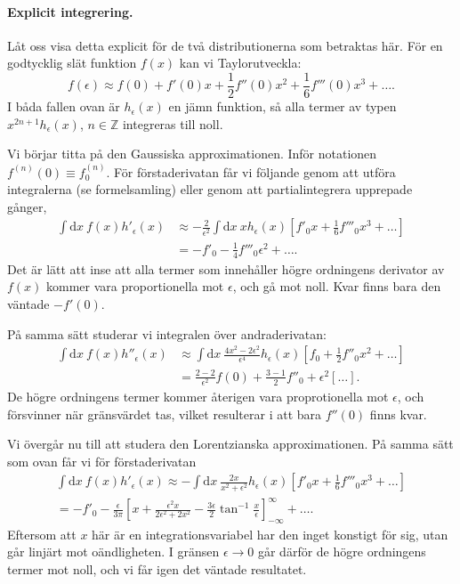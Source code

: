 \documentclass[%
oneside,                 %
final,                   %
10pt]{article}
\newenvironment{doconceexercise}{}{}
\begin{document}
\begin{doconceexercise}
\paragraph{Explicit integrering.}
Låt oss visa detta explicit för de två distributionerna som betraktas här. För en godtycklig slät funktion $f(x)$ kan vi Taylorutveckla:
\begin{equation}
    f(\epsilon)\approx f(0)+f'(0)x+\frac12f''(0)x^2+\frac16f'''(0)x^3+\ldots.
\end{equation}
I båda fallen ovan är $h_\epsilon(x)$ en jämn funktion, så alla termer av typen $x^{2n+1}h_\epsilon(x)$, $n\in\mathbb Z$ integreras till noll. 

Vi börjar titta på den Gaussiska approximationen. Inför notationen $f^{(n)}(0)\equiv f^{(n)}_0$. För förstaderivatan får vi följande genom att utföra integralerna (se formelsamling) eller genom att partialintegrera upprepade gånger,
\begin{align}
    \int\mathrm dx\ f(x)h'_\epsilon(x)&\approx-\frac{2}{\epsilon^2}\int\mathrm dx\ xh_\epsilon(x)\left[f'_0x+\frac16f'''_0x^3+\ldots\right] \nonumber\\
    &=-f'_0-\frac14f'''_0\epsilon^2+\ldots.
\end{align}
Det är lätt att inse att alla termer som innehåller högre ordningens derivator  av $f(x)$ kommer vara proportionella mot $\epsilon$, och gå mot noll. Kvar finns bara den väntade $-f'(0)$.

På samma sätt studerar vi integralen över andraderivatan:
\begin{align}
    \int\mathrm dx\ f(x)h''_\epsilon(x)&\approx\int\mathrm dx\ \frac{4x^2-2\epsilon^2}{\epsilon^4}h_\epsilon(x)\left[f_0+\frac12f''_0x^2+\ldots\right] \nonumber\\
    &=\frac{2-2}{\epsilon^2}f(0)+\frac{3-1}2f''_0 + \epsilon^2 [\ldots].
\end{align}
De högre ordningens termer kommer återigen vara proprotionella mot $\epsilon$, och försvinner när gränsvärdet tas, vilket resulterar i att bara $f''(0)$ finns kvar.

Vi övergår nu till att studera den Lorentzianska approximationen. På samma sätt som ovan får vi för förstaderivatan
\begin{gather}
    \int\mathrm dx\ f(x)h'_\epsilon(x)\approx-\int\mathrm dx\ \frac{2 x}{x^2+\epsilon^2}h_\epsilon(x)\left[f'_0x+\frac16f'''_0x^3+\ldots\right] \nonumber\\
    =-f'_0-\frac\epsilon{3\pi}\left[x+\frac{\epsilon^2x}{2\epsilon^2+2x^2}-\frac{3\epsilon}2\tan^{-1}\frac x\epsilon\right]_{-\infty}^\infty+\ldots.
\end{gather}
Eftersom att $x$ här är en integrationsvariabel har den inget konstigt för sig, utan går linjärt mot oändligheten. I gränsen $\epsilon\rightarrow 0$ går därför de högre ordningens termer mot noll, och vi får igen det väntade resultatet. 


\end{doconceexercise}
\end{document}
